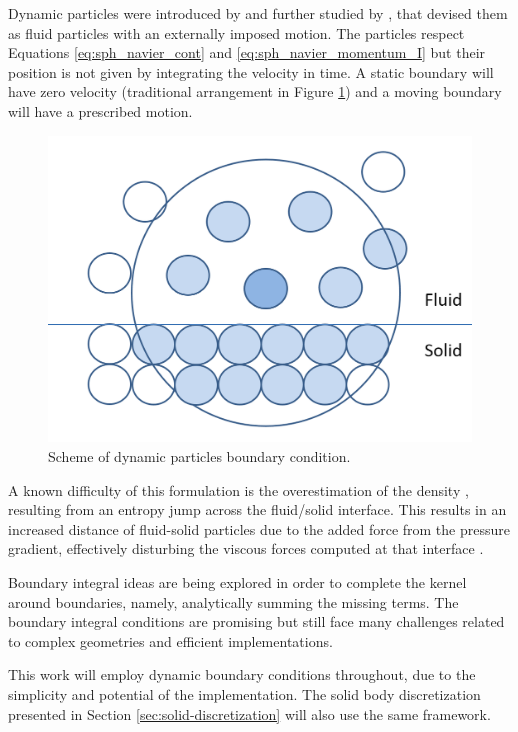 Dynamic particles were introduced by \cite{Dalrymple-2000} and further studied by \cite{Crespo-2007}, that devised them as fluid particles with an externally imposed motion. The particles respect Equations \eqref{eq:sph_navier_cont} and \eqref{eq:sph_navier_momentum_I} but their position is not given by integrating the velocity in time. A static boundary will have zero velocity (traditional arrangement in Figure \ref{fig:Dynamic_particles}) and a moving boundary will have a prescribed motion.
%
\begin{figure}[H]
	\centering
	\includegraphics[width=0.45\linewidth]{Figures/3.Chapter/Dynamic_particles}
	\caption{Scheme of dynamic particles boundary condition.}
	\label{fig:Dynamic_particles} 
\end{figure}
%

A known difficulty of this formulation is the overestimation of the density \citep{Price-2008,Saitoh-2013}, resulting from an entropy jump across the fluid/solid interface. This results in an increased distance of fluid-solid particles due to the added force from the pressure gradient, effectively disturbing the viscous forces computed at that interface \citep{Colagrossi-2003}.

Boundary integral ideas are being explored in order to complete the kernel around boundaries, namely, analytically summing the missing terms. The boundary integral conditions \citep{Ferrand-al-2013, Mayrhofer-al-2015} are promising but still face many challenges related to complex geometries and efficient implementations.

This work will employ dynamic boundary conditions throughout, due to the simplicity and potential of the implementation. The solid body discretization presented in Section \ref{sec:solid-discretization} will also use the same framework.



